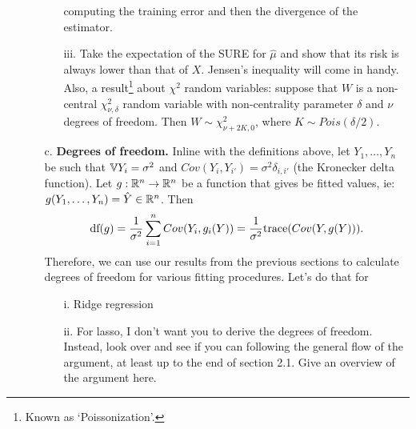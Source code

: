 \documentclass[11pt]{article}
\begin{document}
\begin{enumerate}
\begin{itemize}
\begin{itemize}
computing the training error and then the divergence of the estimator.
\item[iii.] Take the expectation of the SURE for $\hat \mu$ and show that its risk is always lower than that of $X$.  Jensen's 
inequality will come in handy.  Also, a result\footnote{Known as `Poissonization'.} about $\chi^2$ random variables:  suppose that $W$ is a non-central
$\chi_{\nu,\delta}^2$ random variable with non-centrality parameter $\delta$ and $\nu$ degrees of freedom.  
Then $W \sim \chi_{\nu + 2K,0}^2$, where $K \sim Pois(\delta/2)$.
\end{itemize}
\item[c.] \textbf{Degrees of freedom.}  Inline with the definitions above, let $Y_1,\ldots,Y_n$ be such that
$\mathbb{V} Y_i = \sigma^2$ and $Cov(Y_i,Y_{i'}) = \sigma^2 \delta_{i,i'}$ (the Kronecker delta function).  
Let $g: \mathbb{R}^n \rightarrow \mathbb{R}^n$ be a function that gives be fitted values, ie: $g(Y_1,\ldots,Y_n) = \hat{Y} \in \mathbb{R}^n$.  Then
\[
\textrm{df}(g) = \frac{1}{\sigma^2} \sum_{i=1}^n Cov(Y_i,g_i(Y)) = \frac{1}{\sigma^2} \textrm{trace}( Cov(Y,g(Y))).
\]
Therefore, we can use our results from the previous sections to calculate degrees of freedom for various fitting
procedures.  Let's do that for
\begin{itemize}
\item[i.] Ridge regression
\item[ii.] For lasso, I don't want you to derive the degrees of freedom.  Instead, look over \cite{tibshirani2012degrees} 
and see if you can following the general flow of the argument, at least up to the end of section 2.1.  Give an overview 
of the argument here.


\end{itemize}
\end{itemize}
\end{enumerate}
\end{document}
